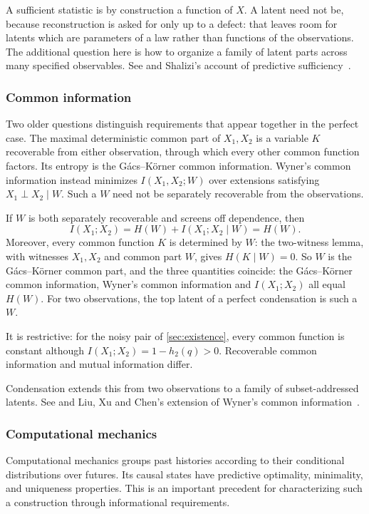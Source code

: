 \documentclass[11pt]{article}
\begin{document}
A sufficient statistic is by construction a function of $X$. A latent need not
be, because reconstruction is asked for only up to a defect: that leaves room
for latents which are parameters of a law rather than functions of the
observations. The additional
question here is how to organize a family of latent parts across many specified
observables. See \citet{fisher1922mathematical}
and Shalizi's account of predictive sufficiency~\citep{shalizi2019prediction}.

\subsubsection{Common information}
Two older questions distinguish requirements that appear together in the
perfect case. The maximal deterministic common part of $X_1,X_2$ is a variable
$K$ recoverable from either observation, through which every other common
function factors. Its entropy is the G\'acs--K\"orner common information.
Wyner's common information instead minimizes $I(X_1,X_2;W)$ over extensions
satisfying $X_1\perp X_2\mid W$. Such a $W$ need not be separately recoverable
from the observations.

If $W$ is both separately recoverable and screens off dependence, then
\[
 I(X_1;X_2)=H(W)+I(X_1;X_2\mid W)=H(W).
\]
Moreover, every common function $K$ is determined by $W$: the two-witness lemma,
with witnesses $X_1,X_2$ and common part $W$, gives $H(K\mid W)=0$.
So $W$ is the G\'acs--K\"orner common part, and the three quantities coincide:
the G\'acs--K\"orner common information, Wyner's common information and
$I(X_1;X_2)$ all equal $H(W)$. For two observations, the top latent of a perfect
condensation is such a $W$.

It is restrictive: for the noisy pair of \cref{sec:existence}, every common
function is constant although $I(X_1;X_2)=1-h_2(q)>0$. Recoverable common
information and mutual information differ.

Condensation extends this from two observations to a family of
subset-addressed latents.
See \citet{gacs1973common}
and Liu, Xu and Chen's extension of Wyner's common information~\citep{liu2010common}.

\subsubsection{Computational mechanics}
Computational mechanics groups past histories according to their conditional
distributions over futures. Its causal states have predictive optimality,
minimality, and uniqueness properties. This is an important precedent for
characterizing such a construction through informational requirements.
\end{document}
